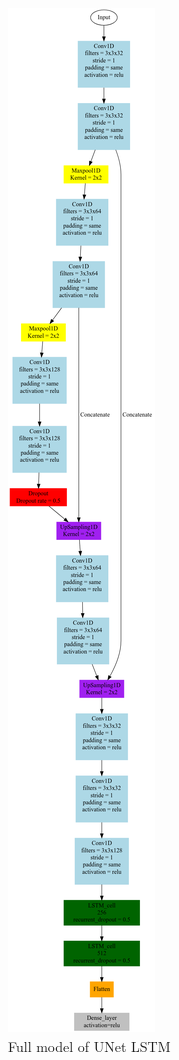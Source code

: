 \documentclass[conference]{IEEEtran}
\begin{document}
\begin{figure}[H]
\begin{center}
\includegraphics[scale=0.22]{models/UNet_LSTM.png}
\end{center}
\caption{Full model of UNet LSTM}
\end{figure}



\end{document}
